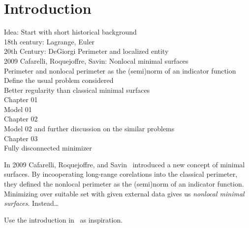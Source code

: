 \chapter{Introduction}
\label{ch:introduction}


Idea: Start with short historical background\\
18th century: Lagrange, Euler\\
20th Century: DeGiorgi Perimeter and localized entity\\
2009 Cafarelli, Roquejoffre, Savin: Nonlocal minimal surfaces\\
Perimeter and nonlocal perimeter as the (semi)norm of an indicator function\\
Define the usual problem considered\\
Better regularity than classical minimal surfaces\\

Chapter 01\\
Model 01\\

Chapter 02\\
Model 02 and further discussion on the similar problems\\

Chapter 03\\
Fully disconnected minimizer




In 2009 Cafarelli, Roquejoffre, and Savin~\cite{caffarelli2009nonlocal} introduced a new
concept of minimal surfaces. By incooperating long-range corelations into the classical
perimeter, they defined the nonlocal perimeter as the (semi)norm of an indicator function.
Minimizing over suitable set with given external data gives us \emph{nonlocal minimal
	surfaces}. Instead\ldots

Use the introduction in~\cite{dipierro2012asymptotics} as inspiration.


